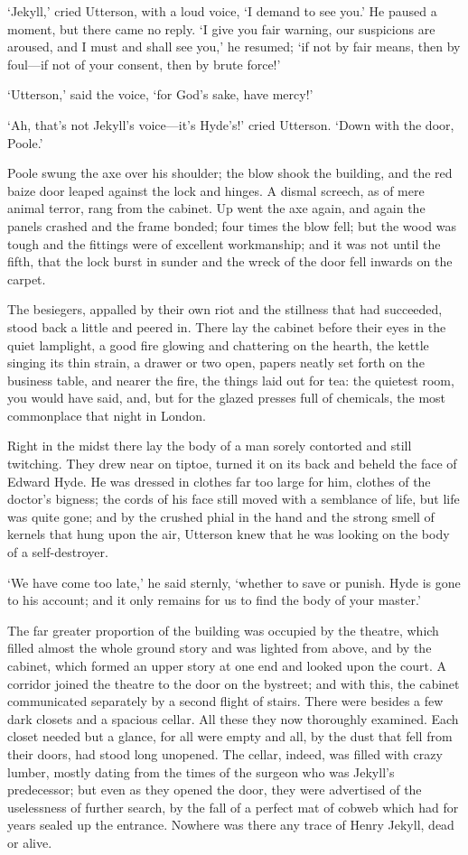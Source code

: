 \documentclass[]{novel}
\begin{document}
‘Jekyll,’ cried Utterson, with a loud voice, ‘I demand to see you.’ He paused a moment, but there came no reply. ‘I give you fair warning, our suspicions are aroused, and I must and shall see you,’ he resumed; ‘if not by fair means, then by foul—if not of your consent, then by brute force!’

‘Utterson,’ said the voice, ‘for God’s sake, have mercy!’

‘Ah, that’s not Jekyll’s voice—it’s Hyde’s!’ cried Utterson. ‘Down with the door, Poole.’

Poole swung the axe over his shoulder; the blow shook the building, and the red baize door leaped against the lock and hinges. A dismal screech, as of mere animal terror, rang from the cabinet. Up went the axe again, and again the panels crashed and the frame bonded; four times the blow fell; but the wood was tough and the fittings were of excellent workmanship; and it was not until the fifth, that the lock burst in sunder and the wreck of the door fell inwards on the carpet.

The besiegers, appalled by their own riot and the stillness that had succeeded, stood back a little and peered in. There lay the cabinet before their eyes in the quiet lamplight, a good fire glowing and chattering on the hearth, the kettle singing its thin strain, a drawer or two open, papers neatly set forth on the business table, and nearer the fire, the things laid out for tea: the quietest room, you would have said, and, but for the glazed presses full of chemicals, the most commonplace that night in London.

Right in the midst there lay the body of a man sorely contorted and still twitching. They drew near on tiptoe, turned it on its back and beheld the face of Edward Hyde. He was dressed in clothes far too large for him, clothes of the doctor’s bigness; the cords of his face still moved with a semblance of life, but life was quite gone; and by the crushed phial in the hand and the strong smell of kernels that hung upon the air, Utterson knew that he was looking on the body of a self-destroyer.

‘We have come too late,’ he said sternly, ‘whether to save or punish. Hyde is gone to his account; and it only remains for us to find the body of your master.’

The far greater proportion of the building was occupied by the theatre, which filled almost the whole ground story and was lighted from above, and by the cabinet, which formed an upper story at one end and looked upon the court. A corridor joined the theatre to the door on the bystreet; and with this, the cabinet communicated separately by a second flight of stairs. There were besides a few dark closets and a spacious cellar. All these they now thoroughly examined. Each closet needed but a glance, for all were empty and all, by the dust that fell from their doors, had stood long unopened. The cellar, indeed, was filled with crazy lumber, mostly dating from the times of the surgeon who was Jekyll’s predecessor; but even as they opened the door, they were advertised of the uselessness of further search, by the fall of a perfect mat of cobweb which had for years sealed up the entrance. Nowhere was there any trace of Henry Jekyll, dead or alive.
\end{document}
